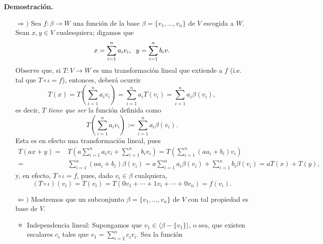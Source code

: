 \noindent
\textbf{Demostración.}
\begin{itemize}
	\item[$\Rightarrow )$] 
	Sea $f: \beta \longrightarrow W$ una función de la base
	$\beta = \{ v_{1}, \ldots , v_{n} \}$ 
	de $V$ escogida a $W$. Sean $x, y \in V$ cualesquiera;
	digamos que
	\begin{equation}
		\label{eq0: 25 sept}
		x = \sum_{i = 1}^{n} a_{i}v_{i}, \hspace{0.2cm}
		y = \sum_{i = 1}^{n} b_{i}v.
	\end{equation}
	Observe que, si $T: V \longrightarrow W$
	es una transformación lineal que extiende a $f$ (i.e.
	tal que $T \circ \iota = f$), entonces, deberá ocurrir
	\[
	T(x) = T \left( \sum_{i=1}^{n}a_{i}v_{i} \right)
	= \sum_{i=1}^{n} a_{i} T(v_{i})
	= \sum_{i=1}^{n} a_{i} \beta(v_{i}),
	\]
	es decir, $T$ \textit{tiene que ser} la función definida como
	\begin{equation}
		\label{eq: definicion extension lineal de definicion en base}
		T \left( \sum_{i=1}^{n}a_{i}v_{i} \right) := 
	\sum_{i=1}^{n} a_{i} \beta(v_{i}).
	\end{equation}
	Esta es en efecto una transformación lineal, pues
	\begin{align*}
	T(ax + y) = & T \left(a \sum_{i=1}^{n}a_{i}v_{i} +
	\sum_{i=1}^{n}b_{i}v_{i}\right) = T  
	\left(\sum_{i=1}^{n}(aa_{i} + b_{i} )v_{i} \right) \\
	= & \sum_{i=1}^{n} (aa_{i} + b_{i}) \beta(v_{i})
	= a\sum_{i=1}^{n} a_{i}\beta(v_{i}) + 
	\sum_{i=1}^{n} b_{i}\beta(v_{i}) = a T(x) + T(y),
	\end{align*}
	y, en efecto, $T \circ \iota = f$, pues, dado 
	$v_{i} \in \beta$ cualquiera,
	\[
	(T \circ \iota)(v_{i}) = T(v_{i}) =
	T (0v_{1} + \cdots + 1 v_{i} + \cdots + 0v_{n}) = f(v_{i}).
	\]
	\item[$\Leftarrow )$] 
	Mostremos que un subconjunto 
	$\beta = \{ v_{1}, \ldots , v_{n} \}$ de $V$ con tal propiedad
	es base de $V$.
	\begin{itemize}
		\item Independencia lineal: Supongamos que $v_{1} \in 
		\langle \beta - \{ v_{1} \} \rangle$, o sea, que existen
		escalares $c_{i}$ tales que 
		$v_{1} = \sum_{i=2}^{n}c_{i}v_{i}$. Sea la función

\end{itemize}
\end{itemize}
